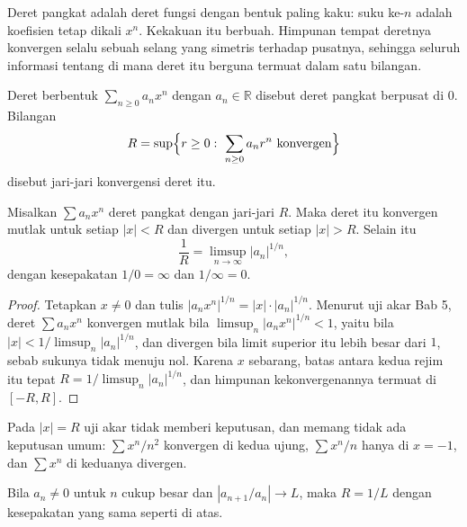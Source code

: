 Deret pangkat adalah deret fungsi dengan bentuk paling kaku: suku ke-$n$ adalah
koefisien tetap dikali $x^n$. Kekakuan itu berbuah. Himpunan tempat deretnya
konvergen selalu sebuah selang yang simetris terhadap pusatnya, sehingga seluruh
informasi tentang di mana deret itu berguna termuat dalam satu bilangan.

\begin{definisi}
Deret berbentuk $\sum_{n\ge0}a_nx^n$ dengan $a_n\in\mathbb{R}$ disebut deret
pangkat berpusat di $0$. Bilangan
\[
  R=\sup\Bigl\{r\ge0:\ \sum_{n\ge0}a_nr^n\ \text{konvergen}\Bigr\}
\]
disebut jari-jari konvergensi deret itu.
\end{definisi}



\begin{teorema}
Misalkan $\sum a_nx^n$ deret pangkat dengan jari-jari $R$. Maka deret itu
konvergen mutlak untuk setiap $|x|<R$ dan divergen untuk setiap $|x|>R$.
Selain itu
\[
  \frac{1}{R}=\limsup_{n\to\infty}|a_n|^{1/n},
\]
dengan kesepakatan $1/0=\infty$ dan $1/\infty=0$.
\end{teorema}

\begin{proof}
Tetapkan $x\ne0$ dan tulis $|a_nx^n|^{1/n}=|x|\cdot|a_n|^{1/n}$. Menurut uji
akar Bab 5, deret $\sum a_nx^n$ konvergen mutlak bila
$\limsup_n|a_nx^n|^{1/n}<1$, yaitu bila $|x|<1/\limsup_n|a_n|^{1/n}$, dan
divergen bila limit superior itu lebih besar dari $1$, sebab sukunya tidak
menuju nol. Karena $x$ sebarang, batas antara kedua rejim itu tepat
$R=1/\limsup_n|a_n|^{1/n}$, dan himpunan kekonvergenannya termuat di $[-R,R]$.
\end{proof}

Pada $|x|=R$ uji akar tidak memberi keputusan, dan memang tidak ada keputusan
umum: $\sum x^n/n^2$ konvergen di kedua ujung, $\sum x^n/n$ hanya di $x=-1$, dan
$\sum x^n$ di keduanya divergen.

\begin{akibat}
Bila $a_n\ne0$ untuk $n$ cukup besar dan $|a_{n+1}/a_n|\to L$, maka $R=1/L$
dengan kesepakatan yang sama seperti di atas.
\end{akibat}

